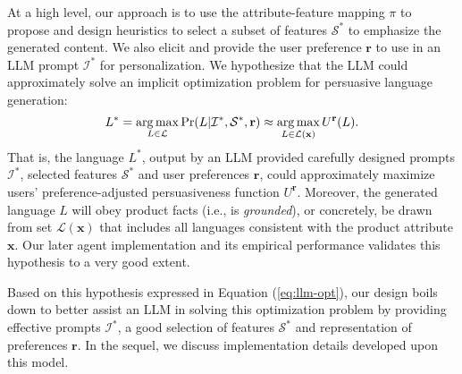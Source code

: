 At a high level, our approach is to use the attribute-feature mapping $\pi$ to propose and design heuristics to select a subset of features $\mathcal{S}^*$ to emphasize the generated content. We also elicit and provide the user preference $\mathbf{r}$  to use in an LLM prompt $\mathcal{I}^*$ for personalization. We hypothesize that the LLM could approximately solve an implicit optimization problem for persuasive language generation:
 \begin{equation}\label{eq:llm-opt}
     \text{}  L^* =  \operatorname*{arg\,max}_{L\in \mathcal{L}} \Pr(L| \mathcal{I}^*, \mathcal{S}^*, \mathbf{r}) \approx \operatorname*{arg\,max}_{L\in \mathcal{L}(\mathbf{x})} U^{\mathbf{r}}( L ).  
 \end{equation}
That is, the language $L^*$, output by an LLM provided carefully designed prompts $\mathcal{I}^*$, selected features $\mathcal{S}^*$ and user preferences $\mathbf{r}$, could approximately maximize users' preference-adjusted persuasiveness function  $U^{\mathbf{r}}$. Moreover, the generated language $L$ will obey product facts (i.e., is \emph{grounded}), or concretely, be drawn from set $\mathcal{L}(\mathbf{x})$ that includes all languages consistent with the product attribute $\mathbf{x}$. Our later agent implementation and its empirical performance validates this hypothesis to a very good extent. 

Based on this hypothesis expressed in Equation (\ref{eq:llm-opt}), our design boils down to better assist an LLM  in solving this optimization problem by providing effective prompts $\mathcal{I}^*$, a good selection of features $\mathcal{S}^*$ and representation of preferences $\mathbf{r}$. 
In the sequel, we discuss implementation details developed upon this model.

